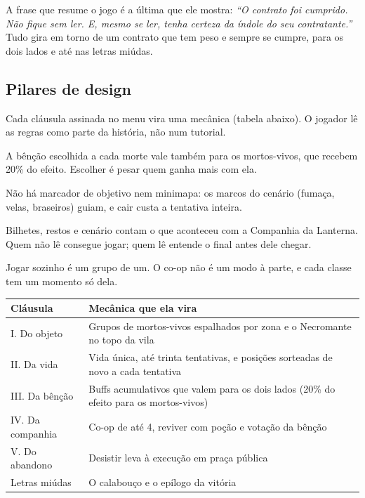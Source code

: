 \documentclass[11pt,a4paper]{article}
\begin{document}
A frase que resume o jogo é a última que ele mostra: \emph{``O contrato foi cumprido. Não fique sem ler. E, mesmo se ler, tenha certeza da índole do seu contratante.''} Tudo gira em torno de um contrato que tem peso e sempre se cumpre, para os dois lados e até nas letras miúdas.

\subsection{Pilares de design}

\begin{description}[leftmargin=0pt]
    \item[O contrato é a regra do jogo.] Cada cláusula assinada no menu vira uma mecânica (tabela abaixo). O jogador lê as regras como parte da história, não num tutorial.
    \item[Toda vantagem tem preço.] A bênção escolhida a cada morte vale também para os mortos-vivos, que recebem 20\% do efeito. Escolher é pesar quem ganha mais com ela.
    \item[Uma vida, sem seta.] Não há marcador de objetivo nem minimapa: os marcos do cenário (fumaça, velas, braseiros) guiam, e cair custa a tentativa inteira.
    \item[A história está no chão.] Bilhetes, restos e cenário contam o que aconteceu com a Companhia da Lanterna. Quem não lê consegue jogar; quem lê entende o final antes dele chegar.
    \item[Junto ou sozinho, o mesmo jogo.] Jogar sozinho é um grupo de um. O co-op não é um modo à parte, e cada classe tem um momento só dela.
\end{description}

\begin{xltabular}{\textwidth}{@{}lX@{}}
\toprule
\textbf{Cláusula} & \textbf{Mecânica que ela vira} \\
\midrule
I. Do objeto & Grupos de mortos-vivos espalhados por zona e o Necromante no topo da vila \\
II. Da vida & Vida única, até trinta tentativas, e posições sorteadas de novo a cada tentativa \\
III. Da bênção & Buffs acumulativos que valem para os dois lados (20\% do efeito para os mortos-vivos) \\
IV. Da companhia & Co-op de até 4, reviver com poção e votação da bênção \\
V. Do abandono & Desistir leva à execução em praça pública \\
Letras miúdas & O calabouço e o epílogo da vitória \\
\bottomrule
\end{xltabular}
\end{document}
